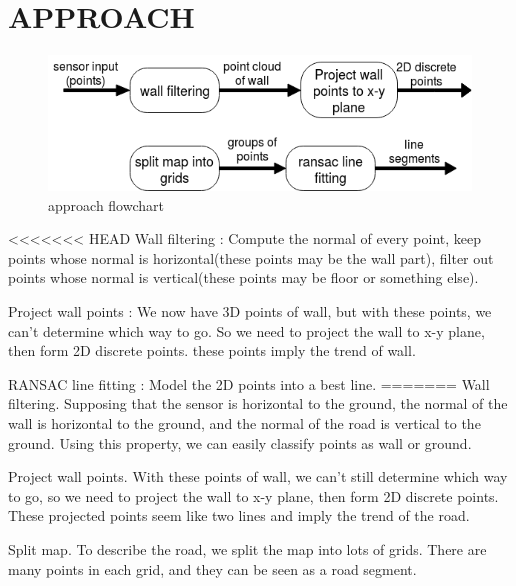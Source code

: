 \documentclass[letterpaper, 10 pt, conference]{ieeeconf}  %
\begin{document}
\section{APPROACH}


\begin{figure}[h] %
\includegraphics[width=1.0\columnwidth]{approach1.png}
\centering
\caption{approach flowchart}
\end{figure}
<<<<<<< HEAD
Wall filtering : Compute the normal of every point, keep points whose normal is horizontal(these points may be the wall part), filter out points whose normal is vertical(these points may be floor or something else).

Project wall points : We now have 3D points of wall, but with these points, we can't determine which way to go. So we need to project the wall to x-y plane, then form 2D discrete points. these points imply the trend of wall.  

RANSAC line fitting : Model the 2D points into a best line.
=======
Wall filtering. Supposing that the sensor is horizontal to the ground, the normal of the wall is horizontal to the ground, and the normal of the road is vertical to the ground. Using this property, we can easily classify points as wall or ground.

Project wall points. With these points of wall, we can't still determine which way to go, so we need to project the wall to x-y plane, then form 2D discrete points. These projected points seem like two lines and imply the trend of the road.  

Split map. To describe the road, we split the map into lots of grids. There are many points in each grid, and they can be seen as a road segment.
\end{document}
